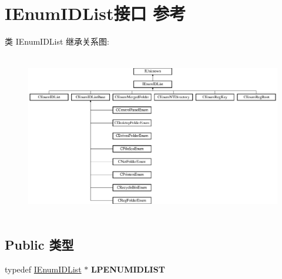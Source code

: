 \hypertarget{interface_i_enum_i_d_list}{}\section{I\+Enum\+I\+D\+List接口 参考}
\label{interface_i_enum_i_d_list}
类 I\+Enum\+I\+D\+List 继承关系图\+:\begin{figure}[H]
\begin{center}
\leavevmode
\includegraphics[height=7.230048cm]{interface_i_enum_i_d_list}
\end{center}
\end{figure}
\subsection*{Public 类型}
\begin{DoxyCompactItemize}
\item 
\mbox{\label{interface_i_enum_i_d_list_a8ce335bb84d66b613eb269b50017edb1}} 
typedef \hyperlink{interface_i_enum_i_d_list}{I\+Enum\+I\+D\+List} $\ast$ {\bfseries L\+P\+E\+N\+U\+M\+I\+D\+L\+I\+ST}
\end{DoxyCompactItemize}
